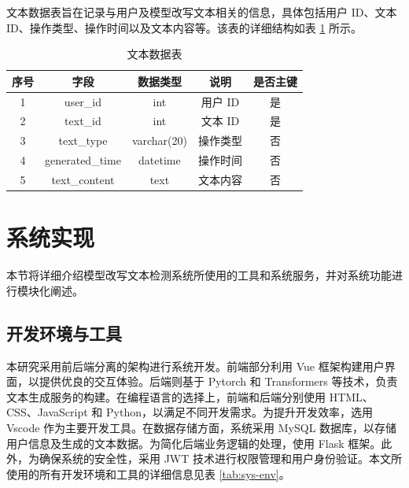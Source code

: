 文本数据表旨在记录与用户及模型改写文本相关的信息，具体包括用户 ID、文本 ID、操作类型、操作时间以及文本内容等。该表的详细结构如表 \ref{tab:text-table} 所示。

\begin{table}[htbp]
    \centering
    \caption{文本数据表} \label{tab:text-table}
    \begin{tabular}{ccccc}
        \toprule
        \textbf{序号} & \textbf{字段} & \textbf{数据类型} & \textbf{说明} & \textbf{是否主键} \\
        \midrule
        1 & user\_id & int & 用户 ID & 是 \\
        2 & text\_id & int & 文本 ID & 是 \\
        3 & text\_type & varchar(20) & 操作类型 & 否 \\
        4 & generated\_time & datetime & 操作时间 & 否 \\
        5 & text\_content & text & 文本内容 & 否 \\
        \bottomrule
    \end{tabular}
\end{table}

\section{系统实现}
\label{sec:sys-implement}

本节将详细介绍模型改写文本检测系统所使用的工具和系统服务，并对系统功能进行模块化阐述。

\subsection{开发环境与工具}
\label{sec:sys-env}

本研究采用前后端分离的架构进行系统开发。前端部分利用 Vue 框架构建用户界面，以提供优良的交互体验。后端则基于 Pytorch 和 Transformers 等技术，负责文本生成服务的构建。在编程语言的选择上，前端和后端分别使用 HTML、CSS、JavaScript 和 Python，以满足不同开发需求。为提升开发效率，选用 Vscode 作为主要开发工具。在数据存储方面，系统采用 MySQL 数据库，以存储用户信息及生成的文本数据。为简化后端业务逻辑的处理，使用 Flask 框架。此外，为确保系统的安全性，采用 JWT 技术进行权限管理和用户身份验证。本文所使用的所有开发环境和工具的详细信息见表 \ref{tab:sys-env}。

